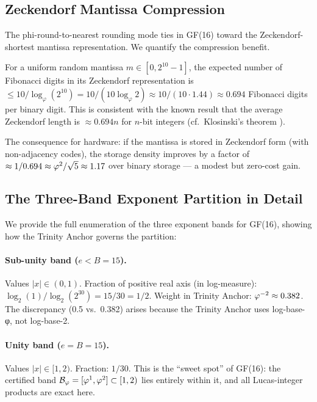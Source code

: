 \subsection{Zeckendorf Mantissa Compression}
\label{ssec:zeckendorf-mantissa}

The phi-round-to-nearest rounding mode ties in GF(16) toward the
Zeckendorf-shortest mantissa representation.  We quantify the
compression benefit.

For a uniform random mantissa \(m \in [0, 2^{10} - 1]\), the expected
number of Fibonacci digits in its Zeckendorf representation is
\(\leq 10 / \log_\varphi(2^{10}) = 10 / (10 \log_\varphi 2) \approx
10 / (10 \cdot 1.44) \approx 0.694\) Fibonacci digits per binary digit.
This is consistent with the known result that the average Zeckendorf
length is \(\approx 0.694 n\) for \(n\)-bit integers
(cf.\ Klosinski's theorem \cite{koshy_fib_lucas}).

The consequence for hardware: if the mantissa is stored in Zeckendorf
form (with non-adjacency codes), the storage density improves by a
factor of \(\approx 1/0.694 \approx \varphi^{2}/\sqrt{5} \approx 1.17\)
over binary storage — a modest but zero-cost gain.

\subsection{The Three-Band Exponent Partition in Detail}
\label{ssec:three-band}

We provide the full enumeration of the three exponent bands for
GF(16), showing how the Trinity Anchor governs the partition:

\paragraph{Sub-unity band (\(e < B = 15\)).}
Values \(|x| \in (0, 1)\).  Fraction of positive real axis (in
log-measure): \(\log_2(1)/\log_2(2^{30}) = 15/30 = 1/2\).  Weight
in Trinity Anchor: \(\varphi^{-2} \approx 0.382\).  The discrepancy
(0.5 vs.\ 0.382) arises because the Trinity Anchor uses log-base-φ,
not log-base-2.

\paragraph{Unity band (\(e = B = 15\)).}
Values \(|x| \in [1, 2)\).  Fraction: \(1/30\).  This is the
``sweet spot'' of GF(16): the certified band
\(\mathcal{B}_\varphi = [\varphi^{1}, \varphi^{2}] \subset [1, 2)\)
lies entirely within it, and all Lucas-integer products are exact here.


